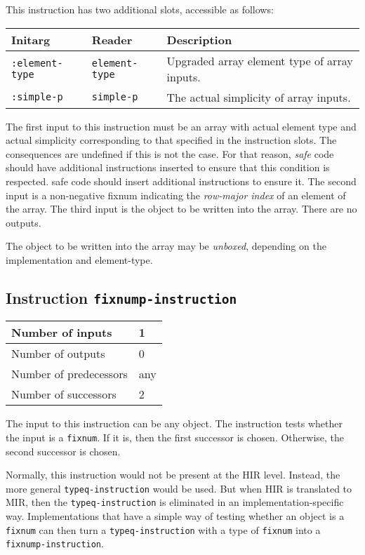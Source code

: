 This instruction has two additional slots, accessible as follows:

\begin{tabular}{|l|l|l|}
  \hline
  Initarg & Reader & Description\\
  \hline\hline
  \texttt{:element-type} & \texttt{element-type} & Upgraded array element type of array inputs.\\
  \hline
  \texttt{:simple-p} & \texttt{simple-p} & The actual simplicity of array inputs.\\
  \hline
\end{tabular}

The first input to this instruction must be an array with actual
element type and actual simplicity corresponding to that specified
in the instruction slots. The consequences are undefined if this is
not the case.  For that reason,
\emph{safe} code should have additional instructions inserted to
ensure that this condition is respected.
 safe code should insert additional instructions to
ensure it. The second input is a non-negative fixnum indicating the
\emph{row-major index} of an element of the array. The third input
is the object to be written into the array. There are no outputs.

The object to be written into the array may be \emph{unboxed}, depending
on the implementation and element-type.

\subsection{Instruction \texttt{fixnump-instruction}}
\label{hir-instruction-car}

\begin{tabular}{|l|l|}
\hline
Number of inputs & 1\\
\hline
Number of outputs & 0\\
\hline
Number of predecessors & any\\
\hline
Number of successors & 2\\
\hline
\end{tabular}

The input to this instruction can be any object.  The instruction
tests whether the input is a \texttt{fixnum}.  If it is, then the
first successor is chosen.  Otherwise, the second successor is chosen.

Normally, this instruction would not be present at the HIR level.
Instead, the more general \texttt{typeq-instruction}
 would be used.  But when HIR is
translated to MIR, then the \texttt{typeq-instruction} is eliminated
in an implementation-specific way.  Implementations that have a simple
way of testing whether an object is a \texttt{fixnum} can then turn
a \texttt{typeq-instruction} with a type of \texttt{fixnum} into a
\texttt{fixnump-instruction}.

